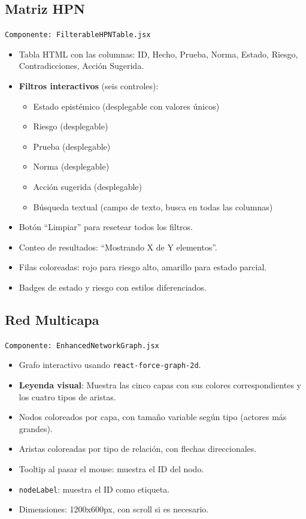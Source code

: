 \documentclass[12pt, letterpaper]{article}
\begin{document}
\subsection{Matriz HPN}

\texttt{Componente: FilterableHPNTable.jsx}

\begin{itemize}[nosep]
  \item Tabla HTML con las columnas: ID, Hecho, Prueba, Norma,
    Estado, Riesgo, Contradicciones, Acción Sugerida.
  \item \textbf{Filtros interactivos} (seis controles):
    \begin{itemize}[nosep]
      \item Estado epistémico (desplegable con valores únicos)
      \item Riesgo (desplegable)
      \item Prueba (desplegable)
      \item Norma (desplegable)
      \item Acción sugerida (desplegable)
      \item Búsqueda textual (campo de texto, busca en todas las
        columnas)
    \end{itemize}
  \item Botón ``Limpiar'' para resetear todos los filtros.
  \item Conteo de resultados: ``Mostrando X de Y elementos''.
  \item Filas coloreadas: rojo para riesgo alto, amarillo para
    estado parcial.
  \item Badges de estado y riesgo con estilos diferenciados.
\end{itemize}

\subsection{Red Multicapa}

\texttt{Componente: EnhancedNetworkGraph.jsx}

\begin{itemize}[nosep]
  \item Grafo interactivo usando \texttt{react-force-graph-2d}.
  \item \textbf{Leyenda visual}: Muestra las cinco capas con sus
    colores correspondientes y los cuatro tipos de aristas.
  \item Nodos coloreados por capa, con tamaño variable según tipo
    (actores más grandes).
  \item Aristas coloreadas por tipo de relación, con flechas
    direccionales.
  \item Tooltip al pasar el mouse: muestra el ID del nodo.
  \item \texttt{nodeLabel}: muestra el ID como etiqueta.
  \item Dimensiones: 1200x600px, con scroll si es necesario.
\end{itemize}
\end{document}
